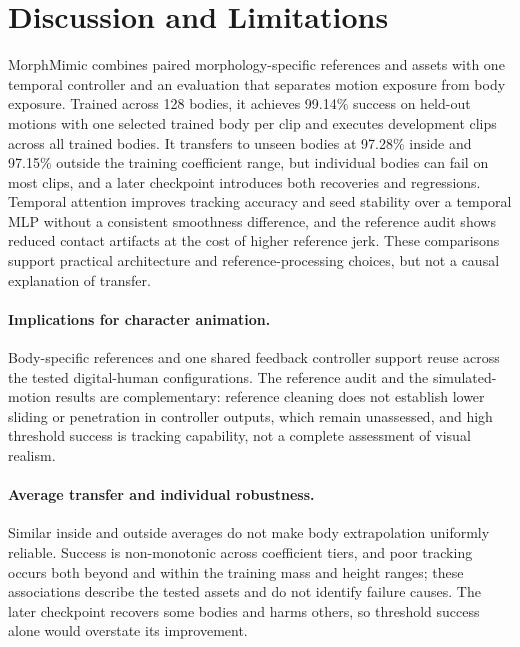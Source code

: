 \section{Discussion and Limitations}\label{sec:discussion}
MorphMimic combines paired morphology-specific references and assets with one
temporal controller and an evaluation that separates motion exposure from body
exposure. Trained across 128 bodies, it achieves 99.14\% success on held-out
motions with one selected trained body per clip and executes development clips
across all trained bodies. It transfers to unseen bodies at 97.28\% inside and
97.15\% outside the training coefficient range, but individual bodies can fail
on most clips, and a later checkpoint introduces both recoveries and
regressions. Temporal attention improves tracking accuracy and seed stability
over a temporal MLP without a consistent smoothness difference, and the
reference audit shows reduced contact artifacts at the cost of higher reference
jerk. These comparisons support practical architecture and reference-processing
choices, but not a causal explanation of transfer.

\paragraph{Implications for character animation.}
Body-specific references and one shared feedback controller support reuse across
the tested digital-human configurations. The reference audit and the
simulated-motion results are complementary: reference cleaning does not
establish lower sliding or penetration in controller outputs, which remain
unassessed, and high threshold success is tracking capability, not a complete
assessment of visual realism.

\paragraph{Average transfer and individual robustness.}
Similar inside and outside averages do not make body extrapolation uniformly
reliable. Success is non-monotonic across coefficient tiers, and poor tracking
occurs both beyond and within the training mass and height ranges; these
associations describe the tested assets and do not identify failure causes. The
later checkpoint recovers some bodies and harms others, so threshold success
alone would overstate its improvement.

